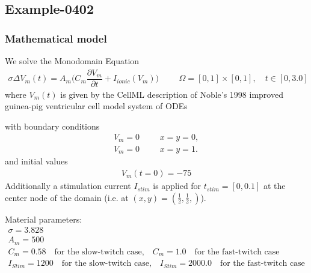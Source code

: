 %
\clearpage
%
\subsection{Example-0402}
%
%
\subsubsection{Mathematical model}
%
We solve the Monodomain Equation
%
\begin{align}
    \sigma \Delta V_m(t) = A_m\Big(C_m \dfrac{\partial V_m}{\partial t} + I_{ionic}(V_m)\Big) & &&\Omega = [0, 1] \times [0, 1], \quad t \in [0, 3.0]
\end{align}
%
where $V_m(t)$ is given by the CellML description of Noble's 1998 improved
guinea-pig ventricular cell model system of ODEs

with boundary conditions
%
\begin{align}
    V_m = 0 & &&x = y = 0, \\
    V_m = 0 & &&x = y = 1.
\end{align}
and initial values 
%
\begin{equation*}
  \begin{array}{lll}
    V_m(t=0) = -75
  \end{array}
\end{equation*}
%
Additionally a stimulation current $I_{stim}$ is applied for $t_{stim} = [0, 0.1]$ at the center node of the domain (i.e. at $(x,y) = (\frac12, \frac12,)$).
%

Material parameters:
\begin{equation*}
  \begin{array}{lll}
    \sigma = 3.828\\[4mm]
    A_m = 500\\[4mm]
    C_m = 0.58 \quad \text{for the slow-twitch case,} \quad C_m = 1.0 \quad \text{for the fast-twitch case}\\[4mm]
    I_{Stim} = 1200 \quad \text{for the slow-twitch case,} \quad I_{Stim} = 2000.0 \quad \text{for the fast-twitch case}\\[4mm]    
  \end{array}
\end{equation*}
%
%
